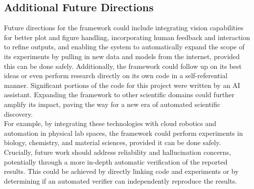 \subsection{Additional Future Directions}    
    \begin{justify}    
        Future directions for the framework could include integrating vision capabilities for better plot and figure handling, incorporating human feedback and interaction to refine outputs, and enabling the system to automatically expand the scope of its experiments by pulling in new data and models from the internet, provided this can be done safely. Additionally, the framework could follow up on its best ideas or even perform research directly on its own code in a self-referential manner. Significant portions of the code for this project were written by an AI assistant. Expanding the framework to other scientific domains could further amplify its impact, paving the way for a new era of automated scientific discovery.\\
        For example, by integrating these technologies with cloud robotics and automation in physical lab spaces, the framework could perform experiments in biology, chemistry, and material sciences, provided it can be done safely. Crucially, future work should address reliability and hallucination concerns, potentially through a more in-depth automatic verification of the reported results. This could be achieved by directly linking code and experiments or by determining if an automated verifier can independently reproduce the results.
    \end{justify}

